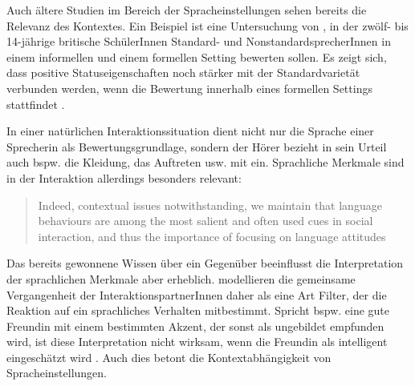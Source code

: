 Auch ältere Studien im Bereich der Spracheinstellungen sehen bereits die Relevanz des Kontextes.
Ein Beispiel ist eine Untersuchung von \citet{Creber.1983}, in der zwölf- bis 14-jährige britische SchülerInnen Standard- und NonstandardsprecherInnen in einem informellen und einem formellen Setting bewerten sollen. 
Es zeigt sich, dass positive Statuseigenschaften noch stärker mit der Standardvarietät verbunden werden, wenn die Bewertung innerhalb eines formellen Settings stattfindet \citep[s.][159]{Creber.1983}.

In einer nat{\"u}rlichen Interaktionssituation dient nicht nur die Sprache einer Sprecherin als Bewertungsgrundlage, sondern der H{\"o}rer bezieht in sein Urteil auch bspw. die Kleidung, das Auftreten usw. mit ein. 
Sprachliche Merkmale sind in der Interaktion allerdings besonders relevant: \begin{quote} Indeed, contextual issues notwithstanding, we maintain that language behaviours are among the most salient and often used cues in social interaction, and thus the importance of focusing on language attitudes~\citep[215]{Cargile.1994} \end{quote}
Das bereits gewonnene Wissen über ein Gegenüber beeinflusst die Interpretation der sprachlichen Merkmale aber erheblich. 
\citet{Cargile.1994} modellieren die gemeinsame Vergangenheit der InteraktionspartnerInnen daher als eine Art Filter, der die Reaktion auf ein sprachliches Verhalten mitbestimmt. 
Spricht bspw. eine gute Freundin mit einem bestimmten Akzent, der sonst als ungebildet empfunden wird, ist diese Interpretation nicht wirksam, wenn die Freundin als intelligent eingesch{\"a}tzt wird \citep[s.][222--223]{Cargile.1994}. 
Auch dies betont die Kontextabh{\"a}ngigkeit von Spracheinstellungen.

